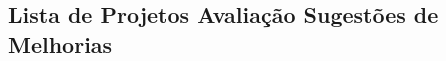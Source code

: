 \begin{appendices}

% 

% 

% 

% 

\chapter{Lista de Projetos Avaliação Sugestões de Melhorias}
\label{ch:app-tb-lista-projetos-sug-melhorias}


% 

\end{appendices}